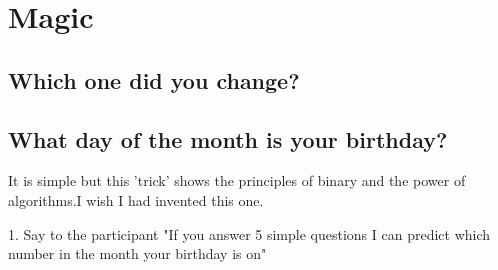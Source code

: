 \chapter{Magic}
\section{Which one did you change?}
\section{What day of the month is your birthday?}
It is simple but this 'trick' shows the principles of binary and the power of algorithms.I wish I had invented this one.

1.	Say to the participant "If you answer 5 simple questions I can predict which number in the month your birthday is on"

